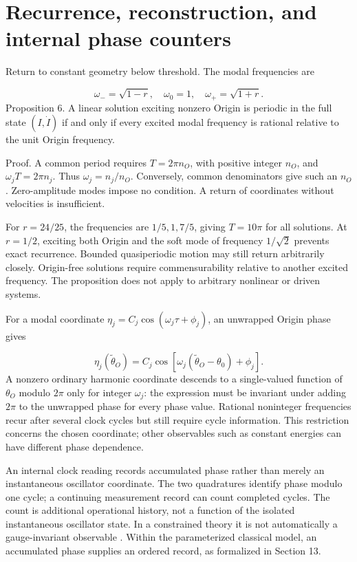 \documentclass[aip,adv,preprint,floatfix]{revtex4-2}
\begin{document}
\section{Recurrence, reconstruction, and internal phase counters}
Return to constant geometry below threshold. The modal frequencies are

\begin{equation}
\omega_-=\sqrt{1-r},\quad \omega_0=1,\quad \omega_+=\sqrt{1+r}.
\end{equation}
Proposition 6. A linear solution exciting nonzero Origin is periodic in the full state $(I,\dot I)$ if and only if every excited modal frequency is rational relative to the unit Origin frequency.

Proof. A common period requires $T=2\pi n_O$, with positive integer $n_O$, and $\omega_jT=2\pi n_j$. Thus $\omega_j=n_j/n_O$. Conversely, common denominators give such an $n_O$. Zero-amplitude modes impose no condition. A return of coordinates without velocities is insufficient.

For $r=24/25$, the frequencies are $1/5,1,7/5$, giving $T=10\pi$ for all solutions. At $r=1/2$, exciting both Origin and the soft mode of frequency $1/\sqrt2$ prevents exact recurrence. Bounded quasiperiodic motion may still return arbitrarily closely. Origin-free solutions require commensurability relative to another excited frequency. The proposition does not apply to arbitrary nonlinear or driven systems.

For a modal coordinate $\eta_j=C_j\cos(\omega_j\tau+\phi_j)$, an unwrapped Origin phase gives

\begin{equation}
\eta_j(\widetilde\theta_O)=C_j\cos[\omega_j(\widetilde\theta_O-\theta_0)+\phi_j].
\end{equation}
A nonzero ordinary harmonic coordinate descends to a single-valued function of $\theta_O$ modulo $2\pi$ only for integer $\omega_j$: the expression must be invariant under adding $2\pi$ to the unwrapped phase for every phase value. Rational noninteger frequencies recur after several clock cycles but still require cycle information. This restriction concerns the chosen coordinate; other observables such as constant energies can have different phase dependence.

An internal clock reading records accumulated phase rather than merely an instantaneous oscillator coordinate. The two quadratures identify phase modulo one cycle; a continuing measurement record can count completed cycles. The count is additional operational history, not a function of the isolated instantaneous oscillator state. In a constrained theory it is not automatically a gauge-invariant observable \cite{r10}. Within the parameterized classical model, an accumulated phase supplies an ordered record, as formalized in Section 13.
\end{document}

